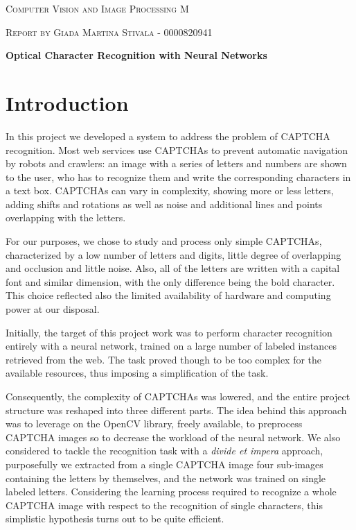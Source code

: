 {\centering
{\scshape\LARGE Computer Vision and Image Processing M \par}
\vspace{1cm}
{\scshape\Large Report by Giada Martina Stivala - 0000820941 \par}
\vspace{1.5cm}
{\huge\bfseries Optical Character Recognition with Neural Networks\par}
\vspace{2cm} \par
}


\section*{Introduction}\label{introduction}

In this project we developed a system to address the problem of CAPTCHA
recognition. Most web services use CAPTCHAs to prevent automatic
navigation by robots and crawlers: an image with a series of letters and
numbers are shown to the user, who has to recognize them and write the
corresponding characters in a text box. CAPTCHAs can vary in complexity,
showing more or less letters, adding shifts and rotations as well
as noise and additional lines and points overlapping with the letters.

For our purposes, we chose to study and process only simple CAPTCHAs,
characterized by a low number of letters and digits, little degree of
overlapping and occlusion and little noise. Also, all of the letters are
written with a capital font and similar dimension, with the only
difference being the bold character. This choice reflected also the limited availability of hardware and computing power at our disposal.

Initially, the target of this project work was to perform character
recognition entirely with a neural network, trained on a large number of
labeled instances retrieved from the web. The task proved though to be
too complex for the available resources, thus imposing a simplification of the task.

Consequently, the complexity of CAPTCHAs was lowered, and the entire
project structure was reshaped into three different parts. The idea
behind this approach was to leverage on the OpenCV library, freely
available, to preprocess CAPTCHA images so to decrease the workload of
the neural network. We also considered to tackle the recognition task
with a \emph{divide et impera} approach, purposefully we extracted from
a single CAPTCHA image four sub-images containing the letters by
themselves, and the network was trained on single labeled letters.
Considering the learning process required to recognize a whole CAPTCHA
image with respect to the recognition of single characters, this
simplistic hypothesis turns out to be quite efficient.


